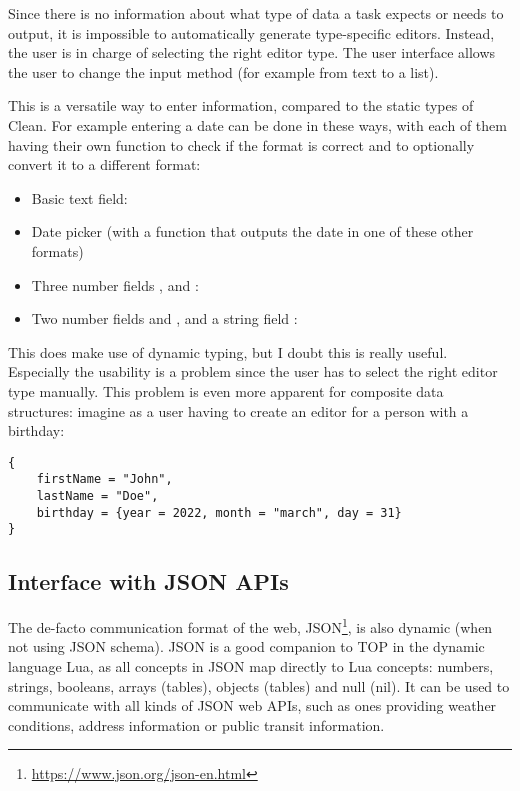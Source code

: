 Since there is no information about what type of data a task expects or needs to output, it is impossible to automatically generate type-specific editors. Instead, the user is in charge of selecting the right editor type. The user interface allows the user to change the input method (for example from text to a list).

This is a versatile way to enter information, compared to the static types of Clean. For example entering a date can be done in these ways, with each of them having their own function to check if the format is correct and to optionally convert it to a different format:
\begin{itemize}
    \item Basic text field: 
    \item Date picker (with a function that outputs the date in one of these other formats)
    \item Three number fields ,  and :\\
    \item Two number fields  and , and a string field :\\
\end{itemize}

This does make use of dynamic typing, but I doubt this is really useful. Especially the usability is a problem since the user has to select the right editor type manually. This problem is even more apparent for composite data structures: imagine as a user having to create an editor for a person with a birthday:

\medskip\noindent
\begin{verbatim}
{
    firstName = "John",
    lastName = "Doe",
    birthday = {year = 2022, month = "march", day = 31}
}
\end{verbatim}

\subsection{Interface with JSON APIs}\label{section-types-json}
The de-facto communication format of the web, JSON\footnote{\url{https://www.json.org/json-en.html}}, is also dynamic (when not using JSON schema). JSON is a good companion to TOP in the dynamic language Lua, as all concepts in JSON map directly to Lua concepts: numbers, strings, booleans, arrays (tables), objects (tables) and null (nil). It can be used to communicate with all kinds of JSON web APIs, such as ones providing weather conditions, address information or public transit information.

